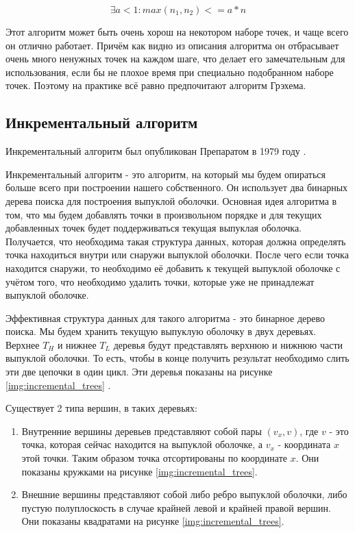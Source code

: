 \begin{equation}\label{eq:quickHullAnalysisConstant}
\exists  a < 1 : max(n_1, n_2) <= a * n
\end{equation}

Этот алгоритм может быть очень хорош на некотором наборе точек, и чаще всего он отлично работает. Причём как видно из описания алгоритма он отбрасывает очень много ненужных точек на каждом шаге, что делает его замечательным для использования, если бы не плохое время при специально подобранном наборе точек. Поэтому на практике всё равно предпочитают алгоритм Грэхема.

\subsection{Инкрементальный алгоритм} \label{subsect1_1_5}

Инкрементальный алгоритм был опубликован Препаратом в 1979 году \cite{preparata1979Incremental}.

Инкрементальный алгоритм - это алгоритм, на который мы будем опираться больше всего при построении нашего собственного. Он использует два бинарных дерева поиска для построения выпуклой оболочки. Основная идея алгоритма в том, что мы будем добавлять точки в произвольном порядке и для текущих добавленных точек будет поддерживаться текущая выпуклая оболочка. Получается, что необходима такая структура данных, которая должна определять точка находиться внутри или снаружи выпуклой оболочки. После чего если точка находится снаружи, то необходимо её добавить к текущей выпуклой оболочке с учётом того, что необходимо удалить точки, которые уже не принадлежат выпуклой оболочке.

Эффективная структура данных для такого алгоритма - это бинарное дерево поиска. Мы будем хранить текущую выпуклую оболочку в двух деревьях. Верхнее $T_H$ и нижнее $T_L$ деревья будут представлять верхнюю и нижнюю части выпуклой оболочки. То есть, чтобы в конце получить результат необходимо слить эти две цепочки в один цикл. Эти деревья показаны на рисунке \ref{img:incremental_trees} \cite{instructor2004incremental}.

Существует 2 типа вершин, в таких деревьях:
\begin{enumerate}
	\item Внутренние вершины деревьев представляют собой пары $(v_x, v)$, где $v$ - это точка, которая сейчас находится на выпуклой оболочке, а $v_x$ - координата $x$ этой точки. Таким образом точка отсортированы по координате $x$. Они показаны кружками на рисунке \ref{img:incremental_trees}.
	\item Внешние вершины представляют собой либо ребро выпуклой оболочки, либо пустую полуплоскость в случае крайней левой и крайней правой вершин. Они показаны квадратами на рисунке \ref{img:incremental_trees}.
\end{enumerate}

